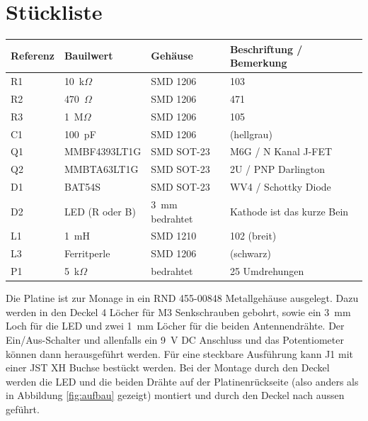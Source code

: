 \documentclass[a4paper,11pt,halfparskip,smallheadings,DIV=10]{scrartcl}
\begin{document}
\section{Stückliste}

\begin{center}\begin{tabular}{llll}\toprule
    \textbf{Referenz} & \textbf{Bauilwert} & \textbf{Gehäuse} & \textbf{Beschriftung / Bemerkung}\\\midrule
R1 & 10~k$\Omega$ & SMD 1206 & 103 \\
R2 & 470~$\Omega$ & SMD 1206 & 471 \\
R3 & 1~M$\Omega$  & SMD 1206 & 105 \\
C1 & 100~pF       & SMD 1206 & (hellgrau) \\
Q1 & MMBF4393LT1G & SMD SOT-23 & M6G / N Kanal J-FET\\ %
Q2 & MMBTA63LT1G  & SMD SOT-23 & 2U / PNP Darlington\\ 
D1 & BAT54S       & SMD SOT-23 & WV4 / Schottky Diode\\ %
D2 & LED (R oder B)    & 3~mm bedrahtet & Kathode ist das kurze Bein\\
L1 & 1~mH         & SMD 1210   & 102 (breit) \\
L3 & Ferritperle  & SMD 1206   & (schwarz) \\
P1 & 5~k$\Omega$  & bedrahtet  & 25 Umdrehungen\\\bottomrule
\end{tabular}\end{center}

Die Platine ist zur Monage in ein RND 455-00848 Metallgehäuse ausgelegt. Dazu
werden in den Deckel 4 Löcher für M3 Senkschrauben gebohrt, sowie ein 3~mm
Loch für die LED und zwei 1~mm Löcher für die beiden Antennendrähte. Der
Ein/Aus-Schalter und allenfalls ein 9~V DC Anschluss und das Potentiometer
können dann herausgeführt werden. Für eine steckbare Ausführung kann J1
mit einer JST XH Buchse bestückt werden. Bei der Montage durch den Deckel
werden die LED und die beiden Drähte auf der Platinenrückseite (also anders
als in Abbildung \ref{fig:aufbau} gezeigt) montiert und durch den Deckel
nach aussen geführt.
\end{document}
